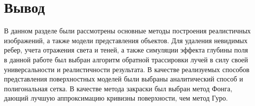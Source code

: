 \section*{Вывод}

В данном разделе были рассмотрены основные методы построения реалистичных изображений, а также модели представления объектов. Для удаления невидимых ребер, учета отражения света и теней, а также симуляции эффекта глубины поля в данной работе был выбран алгоритм обратной трассировки лучей в силу своей универсальности и реалистичности результата. В качестве реализуемых способов представления поверхностных моделей были выбраны аналитический способ и полигональная сетка. В качестве метода закраски был выбран метод Фонга, дающий лучшую аппроксимацию кривизны поверхности, чем метод Гуро.

\clearpage
